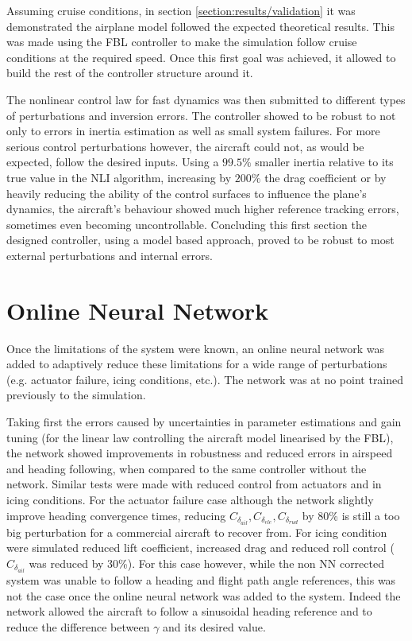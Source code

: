 Assuming cruise conditions, in section \ref{section:results/validation} it was demonstrated the airplane model followed the expected theoretical results. This was made using the FBL controller to make the simulation follow cruise conditions at the required speed. Once this first goal was achieved, it allowed to build the rest of the controller structure around it. 

The nonlinear control law for fast dynamics was then submitted to different types of perturbations and inversion errors. The controller showed to be robust to not only to errors in inertia estimation as well as small system failures. For more serious control perturbations however, the aircraft could not, as would be expected, follow the desired inputs. Using a $99.5\%$ smaller inertia relative to its true value in the NLI algorithm, increasing by $200\%$ the drag coefficient or by heavily reducing the ability of the control surfaces to influence the plane's dynamics, the aircraft's behaviour showed much higher reference tracking errors, sometimes even becoming uncontrollable. Concluding this first section the designed controller, using a model based approach, proved to be robust to most external perturbations and internal errors. 


\section{Online Neural Network}
\label{section:conclusions/online_neural_network}

Once the limitations of the system were known, an online neural network was added to adaptively reduce these limitations for a wide range of perturbations (e.g. actuator failure, icing conditions, etc.). The network was at no point trained previously to the simulation. 

Taking first the errors caused by uncertainties in parameter estimations and gain tuning (for the linear law controlling the aircraft model linearised by the FBL), the network showed improvements in robustness and reduced errors in airspeed and heading following, when compared to the same controller without the network. Similar tests were made with reduced control from actuators and in icing conditions. For the actuator failure case although the network slightly improve heading convergence times, reducing $C_{\delta_{ail}}, C_{\delta_{ele}}, C_{\delta_{rud}}$ by 80\% is still a too big perturbation for a commercial aircraft to recover from. For icing condition were simulated reduced lift coefficient, increased drag and reduced roll control ($C_{\delta_{ail}}$ was reduced by 30\%). For this case however, while the non NN corrected system was unable to follow a heading and flight path angle references, this was not the case once the online neural network was added to the system. Indeed the network allowed the aircraft to follow a sinusoidal heading reference and to reduce the difference between $\gamma$ and its desired value. 

